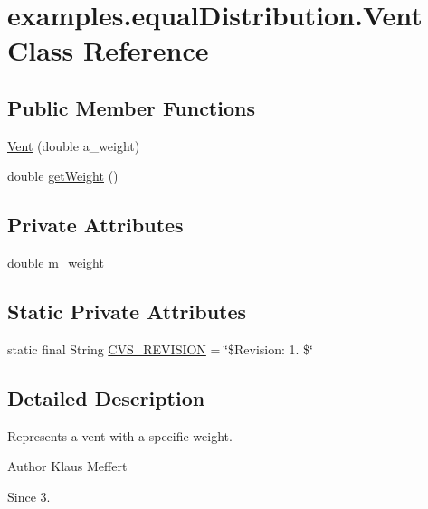 \hypertarget{classexamples_1_1equal_distribution_1_1_vent}{\section{examples.\-equal\-Distribution.\-Vent Class Reference}
\label{classexamples_1_1equal_distribution_1_1_vent}
}
\subsection*{Public Member Functions}
\begin{DoxyCompactItemize}
\item 
\hyperlink{classexamples_1_1equal_distribution_1_1_vent_a1daed0f600284bae80422ac042953aa4}{Vent} (double a\-\_\-weight)
\item 
double \hyperlink{classexamples_1_1equal_distribution_1_1_vent_ae8f47d067ed744b8bf77d5da35b78ee7}{get\-Weight} ()
\end{DoxyCompactItemize}
\subsection*{Private Attributes}
\begin{DoxyCompactItemize}
\item 
double \hyperlink{classexamples_1_1equal_distribution_1_1_vent_ad81bfcb29d6aaec499b8ebca76ae245e}{m\-\_\-weight}
\end{DoxyCompactItemize}
\subsection*{Static Private Attributes}
\begin{DoxyCompactItemize}
\item 
static final String \hyperlink{classexamples_1_1equal_distribution_1_1_vent_aff4d9324fa452954070a30252bde531f}{C\-V\-S\-\_\-\-R\-E\-V\-I\-S\-I\-O\-N} = \char`\"{}\$Revision\-: 1. \$\char`\"{}
\end{DoxyCompactItemize}


\subsection{Detailed Description}
Represents a vent with a specific weight.

\begin{DoxyAuthor}{Author}
Klaus Meffert 
\end{DoxyAuthor}
\begin{DoxySince}{Since}
3. 
\end{DoxySince}


